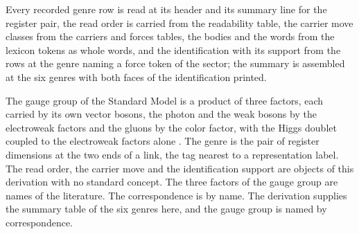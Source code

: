 \chdeps{}{}
Every recorded genre row is read at its header and its summary line for the register pair, the read order is carried from the readability table, the carrier move classes from the carriers and forces tables, the bodies and the words from the lexicon tokens as whole words, and the identification with its support from the rows at the genre naming a force token of the sector; the summary is assembled at the six genres with both faces of the identification printed.

\begin{chbridge}
The gauge group of the Standard Model is a product of three factors, each carried by its own vector bosons, the photon and the weak bosons by the electroweak factors and the gluons by the color factor, with the Higgs doublet coupled to the electroweak factors alone \cite{Glashow1961,Weinberg1967}.
The genre is the pair of register dimensions at the two ends of a link, the tag nearest to a representation label. The read order, the carrier move and the identification support are objects of this derivation with no standard concept. The three factors of the gauge group are names of the literature. The correspondence is by name. The derivation supplies the summary table of the six genres here, and the gauge group is named by correspondence.
\end{chbridge}
